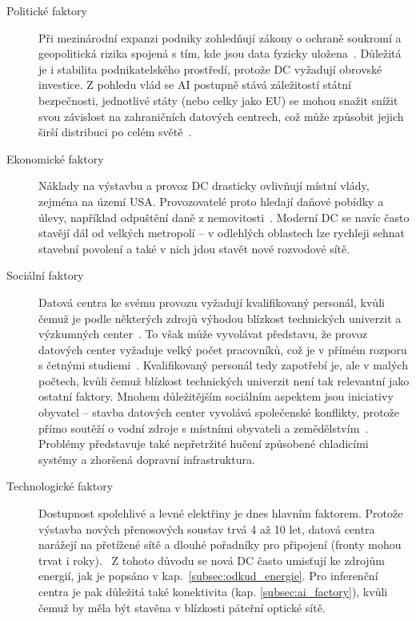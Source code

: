 \begin{description}
    \item[Politické faktory] Při mezinárodní expanzi podniky zohledňují zákony o och\-ra\-ně soukromí a geopolitická rizika spojená s tím, kde jsou data fyzicky uložena~\cite[s.~96]{geng_data_2014}. Důležitá je i stabilita podnikatelského prostředí, protože DC vyžadují obrovské investice. Z pohledu vlád se AI postupně stává záležitostí státní bezpečnosti, jednotlivé státy (nebo celky jako EU) se mohou snažit snížit svou závislost na zahraničních datových centrech, což může způsobit jejich širší distribuci po celém světě~\cite[s.~25]{pilz_compute_2023}. 

    \item[Ekonomické faktory] Náklady na výstavbu a provoz DC drasticky ovlivňují místní vlády, zejména na území USA. Provozovatelé proto hledají daňové pobídky a úlevy, například odpuštění daně z nemovitosti~\cite[s.~89--97]{geng_data_2014}. Moderní DC se navíc často stavějí dál od velkých metropolí -- v odlehlých oblastech lze rychleji sehnat stavební povolení a také v nich jdou stavět nové rozvodové sítě.~\cite[s.~25]{pilz_compute_2023}

    \item[Sociální faktory] Datová centra ke svému provozu vyžadují kvalifikovaný personál, kvůli čemuž je podle některých zdrojů výhodou blízkost technických univerzit a výzkumných center~\cite{geng_data_2014}. To však může vyvolávat představu, že provoz datových center vyžaduje velký počet pracovníků, což je v přímém rozporu s četnými studiemi~\cite{green_what_2025, gargano_subsidizing_2025}. Kvalifikovaný personál tedy zapotřebí je, ale v malých počtech, kvůli čemuž blízkost technických univerzit není tak relevantní jako ostatní faktory. Mnohem důležitějším sociálním aspektem jsou iniciativy obyvatel -- stavba datových center vyvolává společenské konflikty, protože přímo soutěží o vodní zdroje s místními obyvateli a zemědělstvím~\cite[s.~4]{shah_four_2026}. Problémy představuje také nepřetržité hučení způsobené chladicími systémy a zhoršená dopravní infrastruktura.

    \item[Technologické faktory] Dostupnost spolehlivé a levné elektřiny je dnes hlavním faktorem. Protože výstavba nových přenosových soustav trvá 4 až 10 let, datová centra narážejí na přetížené sítě a dlouhé pořadníky pro připojení (fronty mohou trvat i roky).~\cite{ginzburg-ganz_technical_2025, international_energy_agency_iea_energy_2025} Z tohoto důvodu se nová DC často umisťují ke zdrojům energií, jak je popsáno v kap.~\ref{subsec:odkud_energie}. Pro inferenční centra je pak důležitá také konektivita (kap. \ref{subsec:ai_factory}), kvůli čemuž by měla být stavěna v blízkosti páteřní optické sítě. 


\end{description}
